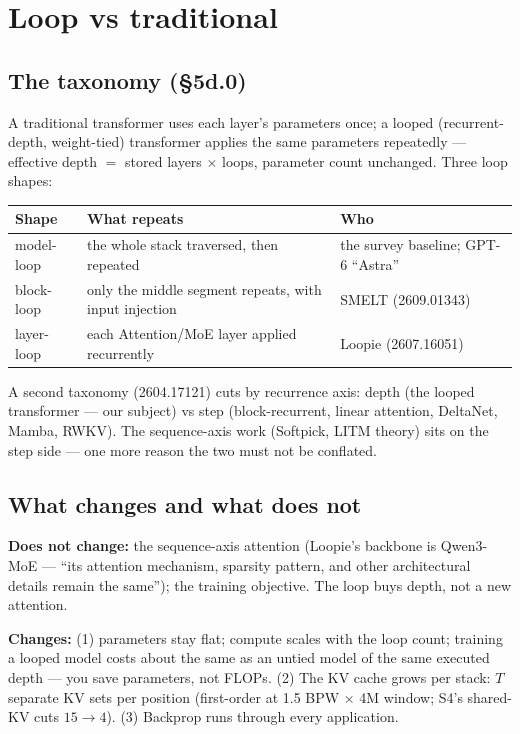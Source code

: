\chapter{Loop vs traditional}

\section{The taxonomy (§5d.0)}

A traditional transformer uses each layer's parameters once; a looped (recurrent-depth,
weight-tied) transformer applies the same parameters repeatedly --- effective depth $=$ stored
layers $\times$ loops, parameter count unchanged. Three loop shapes:

\begin{tabular}{@{}lll@{}}
\toprule
Shape & What repeats & Who\\
\midrule
model-loop & the whole stack traversed, then repeated & the survey baseline; GPT-6 ``Astra''\\
block-loop & only the middle segment repeats, with input injection & SMELT (2609.01343)\\
layer-loop & each Attention/MoE layer applied recurrently & Loopie (2607.16051)\\
\bottomrule
\end{tabular}

\medskip
A second taxonomy (2604.17121) cuts by recurrence axis: depth (the looped transformer --- our
subject) vs step (block-recurrent, linear attention, DeltaNet, Mamba, RWKV). The sequence-axis
work (Softpick, LITM theory) sits on the step side --- one more reason the two must not be
conflated.

\section{What changes and what does not}

\textbf{Does not change:} the sequence-axis attention (Loopie's backbone is Qwen3-MoE ---
``its attention mechanism, sparsity pattern, and other architectural details remain the
same''); the training objective. The loop buys depth, not a new attention.

\textbf{Changes:} (1) parameters stay flat; compute scales with the loop count; training a
looped model costs about the same as an untied model of the same executed depth --- you save
parameters, not FLOPs. (2) The KV cache grows per stack: $T$ separate KV sets per position
(first-order at 1.5 BPW $\times$ 4M window; S4's shared-KV cuts $15 \to 4$). (3) Backprop runs
through every application.

